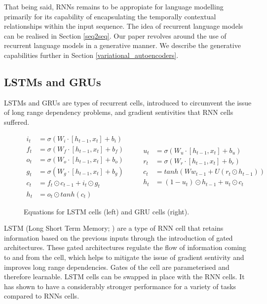 \documentclass[12pt,twoside]{report}
\begin{document}
That being said, RNNs remains to be appropiate for language modelling primarily for its capability of encapsulating the temporally contextual relationships within the input sequence. The idea of recurrent language models can be realised in Section \ref{seq2seq}. Our paper revolves around the use of recurrent language models in a generative manner. We describe the generative capabilities further in Section \ref{variational_autoencoders}.

\subsection{LSTMs and GRUs} 

LSTMs and GRUs are types of recurrent cells, introduced to circumvent the issue of long range dependency problems, and gradient sentivities that RNN cells suffered.

\begin{figure}[!ht]
\begin{equation}
  \begin{split}
    i_t &= \sigma(W_i \cdot [h_{t-1},x_t] + b_i) \\
    f_t &= \sigma(W_f \cdot [h_{t-1},x_t] + b_f) \\
		o_t &= \sigma(W_o \cdot [h_{t-1},x_t] + b_o) \\
		g_t &= \sigma(W_g \cdot [h_{t-1},x_t] + b_g) \\
		c_t &= f_t \odot c_{t-1} + i_t \odot g_t \\
		h_t &= o_t \odot tanh(c_t) 
  \end{split}
	\quad\quad
  \begin{split}
		u_t &= \sigma(W_u \cdot [h_{t-1},x_t] + b_u) \\
		r_t &= \sigma(W_r \cdot [h_{t-1},x_t] + b_r) \\
		c_t &= tanh(Ww_{t-1}+U(r_t \odot h_{t-1})) \\
		h_t &= (1-u_{t})\odot h_{t-1} + u_t \odot c_t
  \end{split}
\end{equation}
\caption{Equations for LSTM cells (left) and GRU cells (right).}
\end{figure}
 
LSTM (Long Short Term Memory; \cite{hochreiter_long_1997}) are a type of RNN cell that retains information based on the previous inputs through the introduction of gated architectures. These gated architectures regulate the flow of information coming to and from the cell, which helps to mitigate the issue of gradient sentivity and improves long range dependencies. Gates of the cell are parameterised and therefore learnable. LSTM cells can be swapped in place with the RNN cells. It has shown to have a considerably stronger performance for a variety of tasks compared to RNNs cells.
\end{document}
